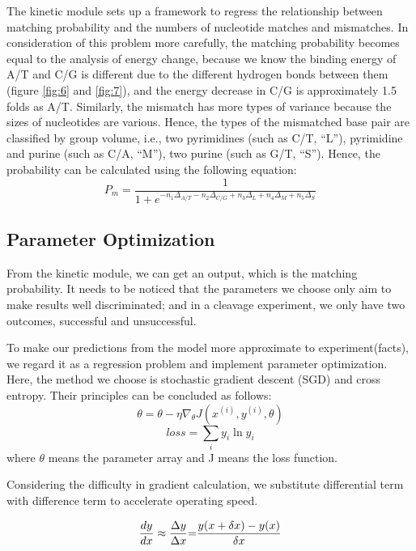 The kinetic module sets up a framework to regress the relationship between matching probability and the numbers of nucleotide matches and mismatches. In consideration of this problem more carefully, the matching probability becomes equal to the analysis of energy change, because we know the binding energy of A/T and C/G is different due to the different hydrogen bonds between them (figure \ref{fig:6} and \ref{fig:7}), and the energy decrease in C/G is approximately 1.5 folds as A/T. Similarly, the mismatch has more types of variance because the sizes of nucleotides are various. Hence, the types of the mismatched base pair are classified by group volume, i.e., two pyrimidines (such as C/T, “L”), pyrimidine and purine (such as C/A, “M”), two purine (such as G/T, “S”). Hence, the probability can be calculated using the following equation:
\begin{equation}
P_{m}=\frac{1}{1+e^{-n_1\Delta_{A/T}-n_2\Delta_{C/G}+n_3\Delta_{L}+n_4\Delta_{M}+n_5\Delta_{S}}}
\end{equation}

\subsection{Parameter Optimization}
From the kinetic module, we can get an output, which is the matching probability. It needs to be noticed that the parameters we choose only aim to make results well discriminated; and in a cleavage experiment, we only have two outcomes, successful and unsuccessful. 

To make our predictions from the model more approximate to experiment(facts), we regard it as a regression problem and implement parameter optimization. Here, the method we choose is stochastic gradient descent (SGD) and cross entropy. Their principles can be concluded as follows:
\begin{equation}
\theta  = \theta  - \eta {\nabla _\theta }J({x^{(i)}},{y^{(i)}},\theta )
\end{equation}
\begin{equation}
loss = \sum\limits_i {{y_i}\ln {y_i}}
\end{equation}
where $\theta$ means the parameter array and J means the loss function. 

Considering the difficulty in gradient calculation, we substitute differential term with difference term to accelerate operating speed.\par
\begin{equation}
\frac{{dy}}{{dx}} \approx \frac{{\Delta y}}{{\Delta x}}{\rm{ = }}\frac{{y(x + \delta x) - y(x)}}{{\delta x}}
\end{equation}

